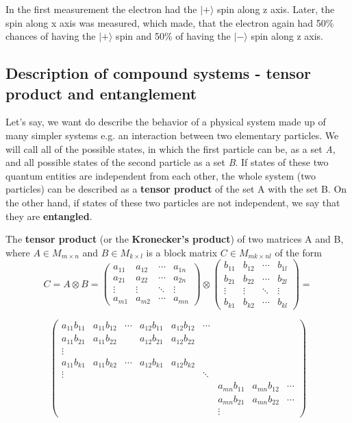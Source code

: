 In the first measurement the electron had the $|+\rangle$ spin along z axis. Later, the spin along x axis was measured, which made, that the electron again had 50\% chances of having the $|+\rangle$ spin and 50\% of having the $|-\rangle$ spin along z axis.

\subsection{Description of compound systems - tensor product and entanglement}

Let's say, we want do describe the behavior of a physical system made up of many simpler systems e.g. an interaction between two elementary particles. We will call all of the possible states, in which the first particle can be, as a set \textit{A}, and all possible states of the second particle as a set \textit{B}. If states of these two quantum entities are independent from each other, the whole system (two particles) can be described as a \textbf{tensor product} of the set A with the set B. On the other hand, if states of these two particles are not independent, we say that they are \textbf{entangled}.

\begin{definition}
The \textbf{tensor product} (or the \textbf{Kronecker's product}) of two matrices A and B, where $A \in M_{m\times n}$ and $B \in M_{k \times l}$ is a block matrix $C \in M_{mk \times nl}$ of the form
\[ C = A \otimes B  = \begin{pmatrix} a_{11} & a_{12} & \cdots & a_{1n} \\
a_{21} & a_{22} & \cdots & a_{2n} \\ \vdots & \vdots & \ddots & \vdots \\ a_{m1} & a_{m2} & \cdots & a_{mn}\end{pmatrix} \otimes \begin{pmatrix} b_{11} & b_{12} & \cdots & b_{1l} \\
b_{21} & b_{22} & \cdots & b_{2l} \\ \vdots & \vdots & \ddots & \vdots \\ b_{k1} & b_{k2} & \cdots & b_{kl}\end{pmatrix} = \]


\[\begin{pmatrix}
a_{11}b_{11} & a_{11}b_{12} & \cdots & a_{12}b_{11} & a_{12}b_{12} & \cdots \\
a_{11}b_{21} & a_{11}b_{22} &  & a_{12}b_{21} & a_{12}b_{22} &  \\
\vdots \\
a_{11}b_{k1} & a_{11}b_{k2} & \cdots & a_{12}b_{k1} & a_{12}b_{k2} \\
\vdots & & & & & \ddots \\
& & & & & & a_{mn}b_{11} & a_{mn}b_{12} & \cdots \\
& & & & & & a_{mn}b_{21} & a_{mn}b_{22} & \cdots \\
& & & & & & \vdots
\end{pmatrix}
\]

\end{definition}

